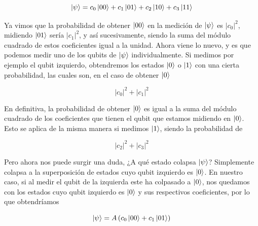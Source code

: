 \documentclass[12pt]{article}
\numberwithin{equation}{section} %
\begin{document}
    \begin{equation*}
        \ket{\psi} = c_{0} \ket{0 0} + c_{1} \ket{0 1} + c_{2} \ket{1 0} + c_{3} \ket{1 1}
    \end{equation*}

    \vspace{2.5mm}

    Ya vimos que la probabilidad de obtener \( \ket{0 0} \) en la medición de \( \ket{\psi} \) es \( | c_{0} |^{2} \), midiendo \( \ket{0 1} \) sería \( | c_{1} |^{2} \), y así sucesivamente, siendo la suma del módulo cuadrado de estos coeficientes igual a la unidad. Ahora viene lo nuevo, y es que podemos medir uno de los qubits de \( \ket{\psi} \) individualmente. Si medimos por ejemplo el qubit izquierdo, obtendremos los estados \( \ket{0} \) o \( \ket{1} \) con una cierta probabilidad, las cuales son, en el caso de obtener \( \ket{0} \) 

    \begin{equation*}
        | c_{0} |^{2} + | c_{1} |^{2}
    \end{equation*}

    \vspace{2.5mm}

    En definitiva, la probabilidad de obtener \( \ket{0} \) es igual a la suma del módulo cuadrado de los coeficientes que tienen el qubit que estamos midiendo en \( \ket{0} \). Esto se aplica de la misma manera si medimos \( \ket{1} \), siendo la probabilidad de

    \begin{equation*}
        | c_{2} |^{2} + | c_{3} |^{2}
    \end{equation*}

    \vspace{2.5mm}

    Pero ahora nos puede surgir una duda, ¿A qué estado colapsa \( \ket{\psi} \)? Simplemente colapsa a la superposición de estados cuyo qubit izquierdo es \( \ket{0} \). En nuestro caso, si al medir el qubit de la izquierda este ha colpasado a \( \ket{0} \), nos quedamos con los estados cuyo qubit izquierdo es \( \ket{0} \) y sus respectivos coeficientes, por lo que obtendríamos
    
    \begin{equation*}
        \ket{\psi} = A \left( c_{0} \ket{0 0} + c_{1} \ket{0 1} \right)
    \end{equation*}

    \vspace{2.5mm}
\end{document}

